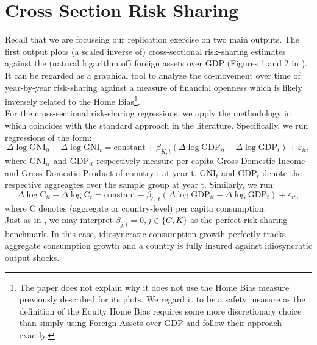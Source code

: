 \documentclass[12pt,a4paper]{article}
\begin{document}
\section{Cross Section Risk Sharing}
Recall that we are focussing our replication exercise on two main outputs. The first output plots (a scaled inverse of) cross-sectional risk-sharing estimates
against the (natural logarithm of) foreign assets over GDP (Figures 1 and 2 in \textcite{main}). It can be regarded as a graphical tool to analyze the co-movement
over time of year-by-year risk-sharing against a measure of financial openness which is likely inversely related to the Home Bias\footnote{The paper does not explain why 
it does not use the Home Bias measure previously described for its plots. We regard it to be a safety measure as the definition of the Equity Home Bias requires 
some more discretionary choice than simply using Foreign Assets over GDP and follow their approach exactly.}.\\
\indent For the cross-sectional risk-sharing regressions, we apply the methodology in \textcite[p.593]{main} which coincides with the standard approach in the literature. 
Specifically, we run regressions of the form:
\begin{equation}
    \Delta \log \mathrm{GNI}_{it}-\Delta \log \mathrm{GNI}_t = \text{constant} + \beta_{K,t}(\Delta \log \mathrm{GDP}_{it}-\Delta\log \mathrm{GDP}_t) + \varepsilon_{it},
\end{equation}
where $\mathrm{GNI}_{it}$ and $\mathrm{GDP}_{it}$ respectively measure per capita Gross Domestic Income and Gross Domestic Product of country i at year t.
$\mathrm{GNI}_t$ and $\mathrm{GDP}_t$ denote the respective aggreagtes over the sample group at year t. Similarly, we run:
\begin{equation}
    \Delta \log \mathrm{C}_{it}-\Delta \log \mathrm{C}_t = \text{constant} + \beta_{C,t}(\Delta \log \mathrm{GDP}_{it}-\Delta\log \mathrm{GDP}_t) + \varepsilon_{it},
\end{equation}
where $\mathrm{C}$ denotes (aggregate or country-level) per capita consumption.\\
\indent Just as in \textcite[p.21]{notes}, we may interpret $\beta_{j,t}=0, j\in\{C,K\}$ as the perfect risk-sharing benchmark. In this case,
idiosyncratic consumption growth perfectly tracks aggregate consumption growth and a country is fully insured against idiosyncratic output shocks.\\
\end{document}
